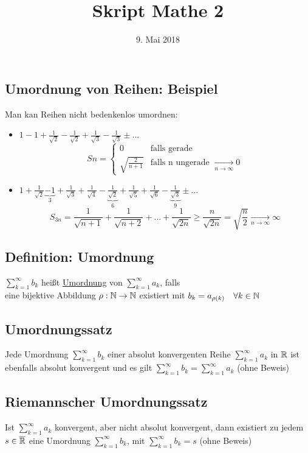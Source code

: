 \documentclass[10pt, a4paper, fleqn]{article}
\begin{document}
    \title{Skript Mathe 2}
    \date{9. Mai 2018}
    \maketitle

    
\fi
    \subsection{Umordnung von Reihen: Beispiel}
    Man kan Reihen nicht bedenkenlos umordnen:
    \begin{itemize}
        \item $\displaystyle 1 - 1 + \frac{1}{\sqrt{2}} - \frac{1}{\sqrt{2}} + \frac{1}{\sqrt{3}} - \frac{1}{\sqrt{3}} \pm ...$
        \[
            Sn = \begin{cases}
                0 &\text{falls gerade} \\
                \sqrt{\frac{2}{n+1}} &\text{falls n ungerade } \xrightarrow[n \to \infty]{} 0
            \end{cases}
        \]
        \item $\displaystyle 1 + \frac{1}{\sqrt{2}} \underbrace{- 1}_3 + \frac{1}{\sqrt{3}} + \frac{1}{\sqrt{4}} - \underbrace{\frac{1}{\sqrt{2}}}_6 + \frac{1}{\sqrt{5}} + \frac{1}{\sqrt{6}} - \underbrace{\frac{1}{\sqrt{3}}}_9 \pm ...$
        \[
            S_{3n} = \frac{1}{\sqrt{n+1}} + \frac{1}{\sqrt{n+2}} + ... + \frac{1}{\sqrt{2n}} \geq \frac{n}{\sqrt{2n}} = \sqrt{\frac{n}{2}} \xrightarrow[n \to \infty]{} \infty
        \]
    \end{itemize}

    \subsection{Definition: Umordnung}
    $\sum_{k=1}^\infty b_k$ heißt \underline{Umordnung} von $\sum_{k=1}^\infty a_k$, falls \\
    eine bijektive Abbildung $\rho: \mathbb{N} \to \mathbb{N}$ existiert mit $b_k = a_{\rho(k)} \quad \forall k \in \mathbb{N}$

    \subsection{Umordnungssatz}
    Jede Umordnung $\sum_{k=1}^\infty b_k$ einer absolut konvergenten Reihe $\sum_{k=1}^\infty a_k$
    in $\mathbb{R}$ ist ebenfalls absolut konvergent und es gilt $\sum_{k=1}^\infty b_k = \sum_{k=1}^\infty a_k$ (ohne Beweis)

    \subsection{Riemannscher Umordnungssatz}
    Ist $\sum_{k=1}^\infty a_k$ konvergent, aber nicht absolut konvergent, dann existiert zu jedem $s \in \overline{\mathbb{R}}$ eine Umordnung
    $\sum_{k=1}^\infty b_k$, mit $\sum_{k=1}^\infty b_k = s$ (ohne Beweis)
\end{document}
